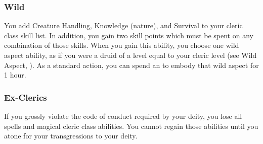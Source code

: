         \subsubsection{Wild}
             You add Creature Handling, Knowledge (nature), and Survival to your cleric class skill list.
            In addition, you gain two skill points which must be spent on any combination of those skills.
             When you gain this ability, you choose one wild aspect ability, as if you were a druid of a level equal to your cleric level (see Wild Aspect, ).
            As a standard action, you can spend an  to embody that wild aspect for 1 hour.

        \subsubsection{Ex-Clerics}
            If you grossly violate the code of conduct required by your deity, you lose all spells and magical cleric class abilities.
            You cannot regain those abilities until you atone for your transgressions to your deity.

